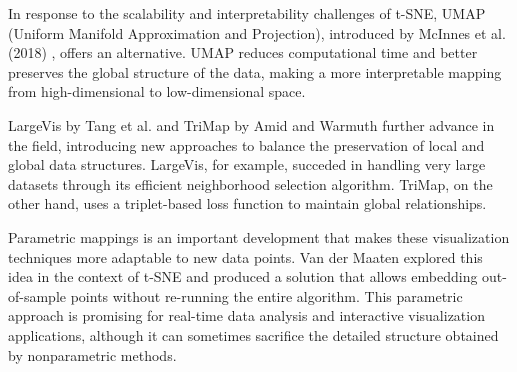 In response to the scalability and interpretability challenges of t-SNE, UMAP (Uniform Manifold Approximation and Projection), introduced by McInnes et al. (2018) \cite{mcinnes2018umap}, offers an alternative. UMAP reduces computational time and better preserves the global structure of the data, making a more interpretable mapping from high-dimensional to low-dimensional space.

LargeVis by Tang et al. \cite{tang2016visualizing} and TriMap by Amid and Warmuth \cite {amid2019trimap} further advance in the field, introducing new approaches to balance the preservation of local and global data structures. LargeVis, for example, succeded in handling very large datasets through its efficient neighborhood selection algorithm. TriMap, on the other hand, uses a triplet-based loss function to maintain global relationships.

Parametric mappings is an important development that makes these visualization techniques more adaptable to new data points. Van der Maaten explored this idea \cite{van2009learning} in the context of t-SNE and produced a solution that allows embedding out-of-sample points without re-running the entire algorithm. This parametric approach is promising for real-time data analysis and interactive visualization applications, although it can sometimes sacrifice the detailed structure obtained by nonparametric methods.